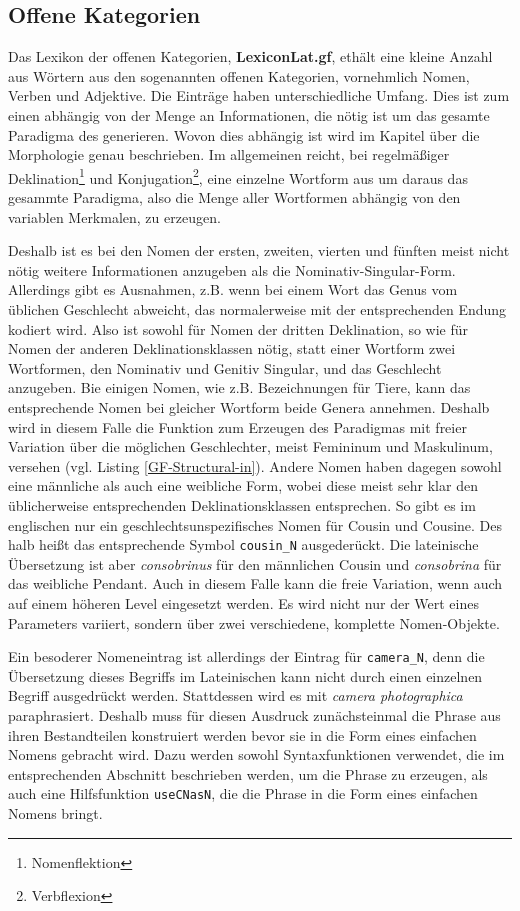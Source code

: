 \documentclass[12pt,abstract=on,titlepage,bibliography=totoc,ngerman,listof=totoc]{scrreprt}
\begin{document}
\subsection{Offene Kategorien}
\label{subsec:offene}
Das Lexikon der offenen Kategorien, \textbf{LexiconLat.gf}, ethält eine kleine Anzahl aus Wörtern aus den sogenannten offenen Kategorien, vornehmlich Nomen, Verben und Adjektive. Die Einträge haben unterschiedliche Umfang. Dies ist zum einen abhängig von der Menge an Informationen, die nötig ist um das gesamte Paradigma des generieren. Wovon dies abhängig ist wird im Kapitel über die Morphologie genau beschrieben. Im allgemeinen reicht, bei regelmäßiger Deklination\footnote{Nomenflektion} und Konjugation\footnote{Verbflexion}, eine einzelne Wortform aus um daraus das gesammte Paradigma, also die Menge aller Wortformen abhängig von den variablen Merkmalen, zu erzeugen. \par
Deshalb ist es bei den Nomen der ersten, zweiten, vierten und fünften meist nicht nötig weitere Informationen anzugeben als die Nominativ-Singular-Form. Allerdings gibt es Ausnahmen, z.B. wenn bei einem Wort das Genus vom üblichen Geschlecht abweicht, das normalerweise mit der entsprechenden Endung kodiert wird. Also ist sowohl für Nomen der dritten Deklination, so wie für Nomen der anderen Deklinationsklassen nötig, statt einer Wortform zwei Wortformen, den Nominativ und Genitiv Singular, und das Geschlecht anzugeben. Bie einigen Nomen, wie z.B. Bezeichnungen für Tiere, kann das entsprechende Nomen bei gleicher Wortform beide Genera annehmen. Deshalb wird in diesem Falle die Funktion zum Erzeugen des Paradigmas mit freier Variation über die möglichen Geschlechter, meist Femininum und Maskulinum, versehen (vgl. Listing \ref{GF-Structural-in}). Andere Nomen haben dagegen sowohl eine männliche als auch eine weibliche Form, wobei diese meist sehr klar den üblicherweise entsprechenden Deklinationsklassen entsprechen. So gibt es im englischen nur ein geschlechtsunspezifisches Nomen für Cousin und Cousine. Des halb heißt das entsprechende Symbol \texttt{cousin\_N} ausgederückt. Die lateinische Übersetzung ist aber \textit{consobrinus} für den männlichen Cousin und \textit{consobrina} für das weibliche Pendant. Auch in diesem Falle kann die freie Variation, wenn auch auf einem höheren Level eingesetzt werden. Es wird nicht nur der Wert eines Parameters variiert, sondern über zwei verschiedene, komplette Nomen-Objekte. \par 
Ein besoderer Nomeneintrag ist allerdings der Eintrag für \texttt{camera\_N}, denn die Übersetzung dieses Begriffs im Lateinischen kann nicht durch einen einzelnen Begriff ausgedrückt werden. Stattdessen wird es mit \textit{camera photographica} paraphrasiert. Deshalb muss für diesen Ausdruck zunächsteinmal die Phrase aus ihren Bestandteilen konstruiert werden bevor sie in die Form eines einfachen Nomens gebracht wird. Dazu werden sowohl Syntaxfunktionen verwendet, die im entsprechenden Abschnitt beschrieben werden, um die Phrase zu erzeugen, als auch eine Hilfsfunktion \texttt{useCNasN}, die die Phrase in die Form eines einfachen Nomens bringt. \par
\end{document}
